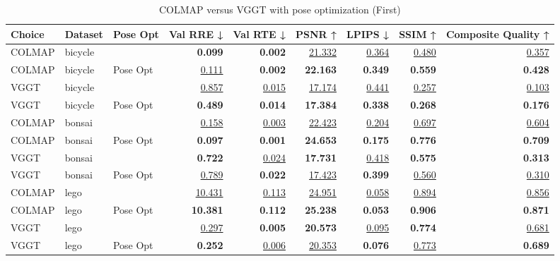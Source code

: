 \begin{table}[H]
\caption{COLMAP versus VGGT with pose optimization (First)}
\label{tab:04_pose_opt_first}
\footnotesize
\begin{tabular}{lllrrrrrr}
\toprule
Choice & Dataset & Pose Opt & Val RRE ↓ & Val RTE ↓ & PSNR ↑ & LPIPS ↓ & SSIM ↑ & Composite Quality ↑ \\
\midrule
COLMAP & bicycle &  & \textbf{0.099} & \textbf{0.002} & \underline{21.332} & \underline{0.364} & \underline{0.480} & \underline{0.357} \\
COLMAP & bicycle & Pose Opt & \underline{0.111} & \textbf{0.002} & \textbf{22.163} & \textbf{0.349} & \textbf{0.559} & \textbf{0.428} \\
\midrule
VGGT & bicycle &  & \underline{0.857} & \underline{0.015} & \underline{17.174} & \underline{0.441} & \underline{0.257} & \underline{0.103} \\
VGGT & bicycle & Pose Opt & \textbf{0.489} & \textbf{0.014} & \textbf{17.384} & \textbf{0.338} & \textbf{0.268} & \textbf{0.176} \\
\midrule
COLMAP & bonsai &  & \underline{0.158} & \underline{0.003} & \underline{22.423} & \underline{0.204} & \underline{0.697} & \underline{0.604} \\
COLMAP & bonsai & Pose Opt & \textbf{0.097} & \textbf{0.001} & \textbf{24.653} & \textbf{0.175} & \textbf{0.776} & \textbf{0.709} \\
\midrule
VGGT & bonsai &  & \textbf{0.722} & \underline{0.024} & \textbf{17.731} & \underline{0.418} & \textbf{0.575} & \textbf{0.313} \\
VGGT & bonsai & Pose Opt & \underline{0.789} & \textbf{0.022} & \underline{17.423} & \textbf{0.399} & \underline{0.560} & \underline{0.310} \\
\midrule
COLMAP & lego &  & \underline{10.431} & \underline{0.113} & \underline{24.951} & \underline{0.058} & \underline{0.894} & \underline{0.856} \\
COLMAP & lego & Pose Opt & \textbf{10.381} & \textbf{0.112} & \textbf{25.238} & \textbf{0.053} & \textbf{0.906} & \textbf{0.871} \\
\midrule
VGGT & lego &  & \underline{0.297} & \textbf{0.005} & \textbf{20.573} & \underline{0.095} & \textbf{0.774} & \underline{0.681} \\
VGGT & lego & Pose Opt & \textbf{0.252} & \underline{0.006} & \underline{20.353} & \textbf{0.076} & \underline{0.773} & \textbf{0.689} \\
\bottomrule
\end{tabular}
\end{table}